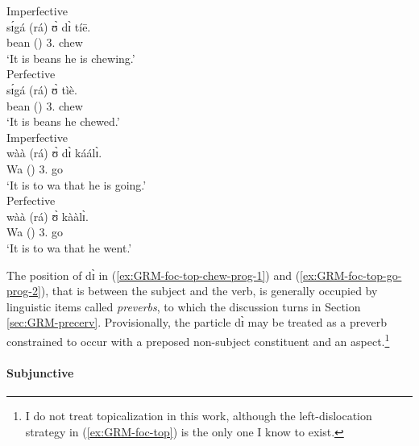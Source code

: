 \begin{exe}
\begin{exe}
\begin{exe}
\begin{exe}
\begin{exe}
\begin{exe}
\begin{exe}
\begin{exe}
\begin{exe}
\begin{exe}
\begin{exe}
\ea\label{ex:GRM-foc-top}
 \ea\label{ex:GRM-foc-top-chew-prog-1}{\rm Imperfective}\\
\gll  sɪ́gá (rá)  ʊ̀ dɪ̀  tíē.\\
 bean  ({\foc}) {3.\sg} {\ipfv} chew\\
\glt `It is {\sc beans} he is chewing.'\\


 \ex\label{ex:GRM-foc-top-chew-perf-1}{\rm Perfective}\\
\gll  sɪ́gá (rá) ʊ̀   tìè.\\
 bean  ({\foc}) {3.\sg}  chew\\
\glt `It is {\sc beans} he chewed.'\\




 \ex\label{ex:GRM-foc-top-go-prog-2}{\rm Imperfective}\\
\gll   wàà (rá) ʊ̀ dɪ̀  káálɪ̀.\\
Wa ({\foc}) {3.\sg} {\ipfv} go\\
\glt `It is to {\sc wa} that he is going.'\\


 \ex\label{ex:GRM-foc-top-go-perf-2}{\rm Perfective}\\
\gll   wàà (rá)  ʊ̀ kààlɪ̀.\\
Wa   ({\foc}) {3.\sg}  go\\
\glt `It is to {\sc wa} that he went.'\\
\z 
 \z

The position of {\sls dɪ̀} in  (\ref{ex:GRM-foc-top-chew-prog-1}) and (\ref{ex:GRM-foc-top-go-prog-2}), that is between the subject and the verb, is generally occupied by linguistic items called  {\it preverbs},  to which the discussion turns in Section \ref{sec:GRM-precerv}.  Provisionally, the particle {\sls dɪ̀} may be treated as a preverb constrained to occur with  a preposed  non-subject constituent and an  aspect.\footnote{I do not treat topicalization in this work, although the left-dislocation strategy in (\ref{ex:GRM-foc-top}) is the only one I know to exist.}


\paragraph{Subjunctive}
\label{sec:GRM-subjunctive}


\end{exe}
\end{exe}
\end{exe}
\end{exe}
\end{exe}
\end{exe}
\end{exe}
\end{exe}
\end{exe}
\end{exe}
\end{exe}
